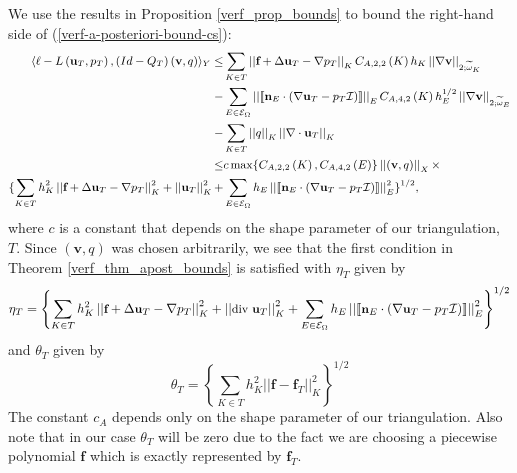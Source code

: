 \documentclass[12pt,a4paper]{article}
\theoremstyle{definition}
\begin{document}
We use the results in Proposition \ref{verf_prop_bounds} to bound the right-hand side of (\ref{verf-a-posteriori-bound-cs}):
\begin{equation}\small
\begin{aligned}\small
\langle \ell -L\left(\textbf{u}_T,p_T\right),\left(Id-Q_T\right)\left(\textbf{v},q\right) \rangle_Y\leq
&\sum_{K\in T}\left|\left|\textbf{f}+\Delta \textbf{u}_T-\nabla p_T \right|\right|_K C_{A,2,2}\left(K\right)h_K \left|\left|\nabla\textbf{v}\right|\right|_{2;\widetilde{\omega}_K}\\
-&\sum_{E\in \mathcal{E}_{\Omega}}\left|\left|\llbracket\textbf{n}_E\cdot\left(\nabla \textbf{u}_T-p_T\mathcal{I}\right)\rrbracket \right|\right|_EC_{A,4,2}\left(K\right)h_E^{1/2} \left|\left|\nabla\textbf{v}\right|\right|_{2;\widetilde{\omega}_E}\\
-&\sum_{K\in T}\left|\left|q\right|\right|_K\left|\left|\nabla \cdot \textbf{u}_T\right|\right|_K\\
\leq &c\max \{C_{A,2,2}\left(K\right),C_{A,4,2}\left(E\right)\}\left|\left|\left(\textbf{v},q\right)\right|\right|_X\times\\ \{\sum_{K\in T}h^2_K\left|\left|\textbf{f}+\Delta \textbf{u}_T-\nabla p_T \right|\right|_K^2+\left|\left|\textbf{u}_T\right|\right|^2_K+&\sum_{E\in \mathcal{E}_{\Omega}}h_E\left|\left|\llbracket\textbf{n}_E\cdot\left(\nabla \textbf{u}_T-p_T\mathcal{I}\right)\rrbracket \right|\right|_E^2 \}^{1/2},
\end{aligned}
\end{equation}
where $c$ is a constant that depends on the shape parameter of our triangulation, $T$.  Since $\left(\textbf{v},q\right)$ was chosen arbitrarily, we see that the first condition in Theorem \ref{verf_thm_apost_bounds} is satisfied with $\eta_T$ given by  
\begin{equation}\small
\eta_T=\left\lbrace \sum_{K\in T}h^2_K\left|\left|\textbf{f}+\Delta \textbf{u}_T-\nabla p_T \right|\right|_K^2+\left|\left|\text{div }\textbf{u}_T\right|\right|^2_K+\sum_{E\in \mathcal{E}_{\Omega}}h_E\left|\left|\llbracket\textbf{n}_E\cdot\left(\nabla \textbf{u}_T-p_T\mathcal{I}\right)\rrbracket \right|\right|_E^2  \right\rbrace ^{1/2}
\end{equation}
and $\theta_T$ given by 
\begin{equation}
\theta_T=\left \lbrace \sum_{K\in T}h^2_K\left|\left|\textbf{f}-\textbf{f}_T\right|\right|^2_K \right \rbrace^{1/2}
\end{equation}
The constant $c_A$ depends only on the shape parameter of our triangulation.  Also note that in our case $\theta_T$ will be zero due to the fact we are choosing a piecewise polynomial $\textbf{f}$ which is exactly represented by $\textbf{f}_T$. 
\end{document}
